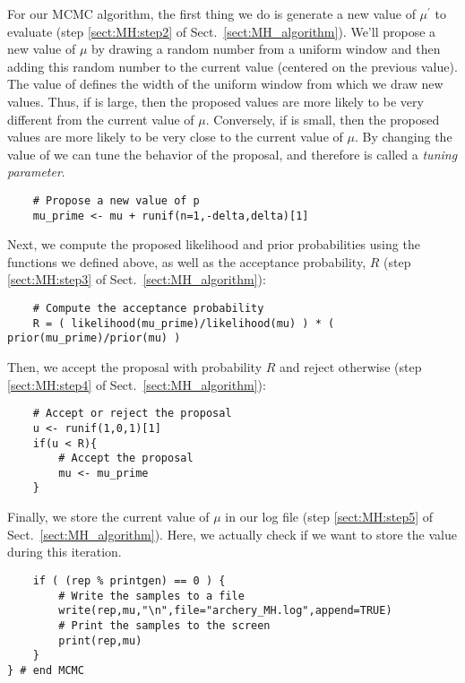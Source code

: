 For our MCMC algorithm, the first thing we do is generate a new value of $\mu^\prime$ to evaluate (step \ref{sect:MH:step2} of Sect.\ \ref{sect:MH_algorithm}).
We'll propose a new value of $\mu$ by drawing a random number from a uniform window and then adding this random number to the current value (\IE centered on the previous value).
The value of  defines the width of the uniform window from which we draw new values.
Thus, if  is large, then the proposed values are more likely to be very different from the current value of $\mu$.
Conversely, if  is small, then the proposed values are more likely to be very close to the current value of $\mu$.
By changing the value of  we can tune the behavior of the proposal, and therefore  is called a \emph{tuning parameter}.
{\tt \begin{snugshade*}
\begin{lstlisting}    
    # Propose a new value of p
    mu_prime <- mu + runif(n=1,-delta,delta)[1]
\end{lstlisting}
\end{snugshade*}}

Next, we compute the proposed likelihood and prior probabilities using the functions we defined above, as well as the acceptance probability, $R$ (step \ref{sect:MH:step3} of Sect.\ \ref{sect:MH_algorithm}):
{\tt \begin{snugshade*}
\begin{lstlisting}    
    # Compute the acceptance probability
    R = ( likelihood(mu_prime)/likelihood(mu) ) * ( prior(mu_prime)/prior(mu) )
\end{lstlisting}
\end{snugshade*}}

Then, we accept the proposal with probability $R$ and reject otherwise (step \ref{sect:MH:step4} of Sect.\ \ref{sect:MH_algorithm}):
{\tt \begin{snugshade*}
\begin{lstlisting}    
    # Accept or reject the proposal
    u <- runif(1,0,1)[1]
    if(u < R){
        # Accept the proposal
        mu <- mu_prime
    }
\end{lstlisting}
\end{snugshade*}}

\pagebreak Finally, we store the current value of $\mu$ in our log file (step \ref{sect:MH:step5} of Sect.\ \ref{sect:MH_algorithm}).
Here, we actually check if we want to store the value during this iteration.
{\tt \begin{snugshade*}
\begin{lstlisting}
    if ( (rep % printgen) == 0 ) {
        # Write the samples to a file
        write(rep,mu,"\n",file="archery_MH.log",append=TRUE)
        # Print the samples to the screen
        print(rep,mu)
    }
} # end MCMC\end{lstlisting}
\end{snugshade*}}


